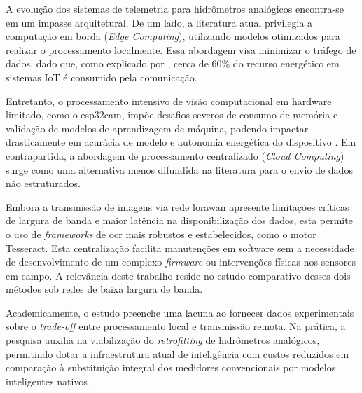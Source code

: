 
A evolução dos sistemas de telemetria para hidrômetros analógicos encontra-se em um impasse arquitetural. 
De um lado, a literatura atual privilegia a computação em borda (\textit{Edge Computing}), utilizando modelos otimizados para realizar o processamento localmente.
Essa abordagem visa minimizar o tráfego de dados, dado que, como explicado por , cerca de 60\% do recurso energético em sistemas IoT é consumido pela comunicação.

Entretanto, o processamento intensivo de visão computacional em hardware limitado, como o \gls{esp32cam}, impõe desafios severos de consumo de memória e validação de modelos de aprendizagem de máquina, podendo impactar drasticamente em acurácia de modelo e autonomia energética do dispositivo .
Em contrapartida, a abordagem de processamento centralizado (\textit{Cloud Computing}) surge como uma alternativa menos difundida na literatura para o envio de dados não estruturados.

Embora a transmissão de imagens via rede \gls{lorawan} apresente limitações críticas de largura de banda e maior latência na disponibilização dos dados, esta permite o uso de \textit{frameworks} de \gls{ocr} mais robustos e estabelecidos, como o motor Tesseract. 
Esta centralização facilita manutenções em software sem a necessidade de desenvolvimento de um complexo \textit{firmware} ou intervenções físicas nos sensores em campo. 
A relevância deste trabalho reside no estudo comparativo desses dois métodos sob redes de baixa largura de banda.

Academicamente, o estudo preenche uma lacuna ao fornecer dados experimentais sobre o \textit{trade-off} entre processamento local e transmissão remota. 
Na prática, a pesquisa auxilia na viabilização do \textit{retrofitting} de hidrômetros analógicos, permitindo dotar a infraestrutura atual de inteligência com custos reduzidos em comparação à substituição integral dos medidores convencionais por modelos inteligentes nativos \cite{Stefano2019}.

